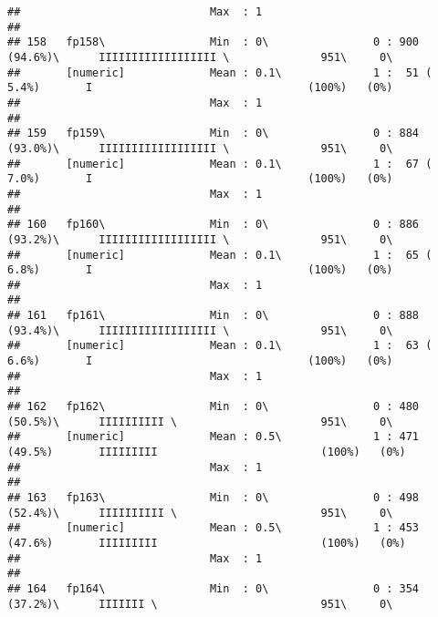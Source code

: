 \documentclass[]{article}
\begin{document}
\begin{verbatim}
##                             Max  : 1                                                                                           
## 
## 158   fp158\                Min  : 0\                0 : 900 (94.6%)\      IIIIIIIIIIIIIIIIII \              951\     0\       
##       [numeric]             Mean : 0.1\              1 :  51 ( 5.4%)       I                                 (100%)   (0%)     
##                             Max  : 1                                                                                           
## 
## 159   fp159\                Min  : 0\                0 : 884 (93.0%)\      IIIIIIIIIIIIIIIIII \              951\     0\       
##       [numeric]             Mean : 0.1\              1 :  67 ( 7.0%)       I                                 (100%)   (0%)     
##                             Max  : 1                                                                                           
## 
## 160   fp160\                Min  : 0\                0 : 886 (93.2%)\      IIIIIIIIIIIIIIIIII \              951\     0\       
##       [numeric]             Mean : 0.1\              1 :  65 ( 6.8%)       I                                 (100%)   (0%)     
##                             Max  : 1                                                                                           
## 
## 161   fp161\                Min  : 0\                0 : 888 (93.4%)\      IIIIIIIIIIIIIIIIII \              951\     0\       
##       [numeric]             Mean : 0.1\              1 :  63 ( 6.6%)       I                                 (100%)   (0%)     
##                             Max  : 1                                                                                           
## 
## 162   fp162\                Min  : 0\                0 : 480 (50.5%)\      IIIIIIIIII \                      951\     0\       
##       [numeric]             Mean : 0.5\              1 : 471 (49.5%)       IIIIIIIII                         (100%)   (0%)     
##                             Max  : 1                                                                                           
## 
## 163   fp163\                Min  : 0\                0 : 498 (52.4%)\      IIIIIIIIII \                      951\     0\       
##       [numeric]             Mean : 0.5\              1 : 453 (47.6%)       IIIIIIIII                         (100%)   (0%)     
##                             Max  : 1                                                                                           
## 
## 164   fp164\                Min  : 0\                0 : 354 (37.2%)\      IIIIIII \                         951\     0\       

\end{verbatim}
\end{document}
